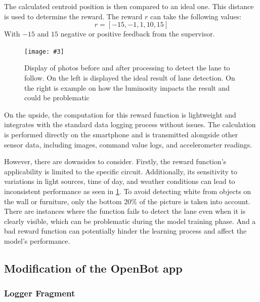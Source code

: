 \documentclass[12pt]{report}
\newcommand\insertfigure[5]{
\begin{figure}[#1]
\begin{center}
\texttt{[image: \#3]}
\end{center}
\caption{#4}
\label{#5}
\end{figure}
}
\begin{document}
The calculated centroid position is then compared to an ideal one. This distance is used to determine the reward. The reward $r$ can take the following values:
$$r = [-15, -1, 1, 10, 15]$$
With $-15$ and $15$ negative or positive feedback from the supervisor.


\insertfigure{th}{0.8\textwidth}{lane_detec.png}{Display of photos before and after processing to detect the lane to follow. On the left is displayed the ideal result of lane detection. On the right is example on how the luminosity impacts the result and could be problematic}{fig:lane_detec}

On the upside, the computation for this reward function is lightweight and integrates with the standard data logging process without issues. The calculation is performed directly on the smartphone and is transmitted alongside other sensor data, including images, command value logs, and accelerometer readings.



However, there are downsides to consider. Firstly, the reward function's applicability is limited to the specific circuit. Additionally, its sensitivity to variations in light sources, time of day, and weather conditions can lead to inconsistent performance as seen in \ref{fig:lane_detec}. To avoid detecting white from objects on the wall or furniture, only the bottom 20\% of the picture is taken into account. There are instances where the function fails to detect the lane even when it is clearly visible, which can be problematic during the model training phase. And a bad reward function can potentially hinder the learning process and affect the model's performance.

\subsection{Modification of the OpenBot app}
\label{sub:Modification_of_openbot}
\subsubsection{Logger Fragment}
\end{document}
